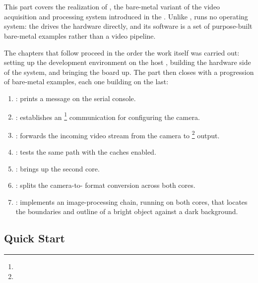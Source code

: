 \chapter{}
\label{chap:fpgasteel-intro}

This part covers the realization of , the bare-metal variant of the video acquisition and processing system introduced in the . Unlike ,  runs no operating system: the  drives the hardware directly, and its software is a set of purpose-built bare-metal examples rather than a  video pipeline.

The chapters that follow proceed in the order the work itself was carried out: setting up the development environment on the host , building the hardware side of the system, and bringing the board up. The part then closes with a progression of bare-metal examples, each one building on the last:

\begin{enumerate}
    \item {}: prints a message on the serial console.
    \item {}: establishes an \footnote{} communication for configuring the camera.
    \item {}: forwards the incoming video stream from the camera to \footnote{} output.
    \item {}: tests the same path with the  caches enabled.
    \item {}: brings up the second core.
    \item {}: splits the camera-to- format conversion across both cores.
    \item {}: implements an image-processing chain, running on both cores, that locates the boundaries and outline of a bright object against a dark background.
\end{enumerate}

\section{Quick Start}
\label{sec:fpgasteel-quick-start}

